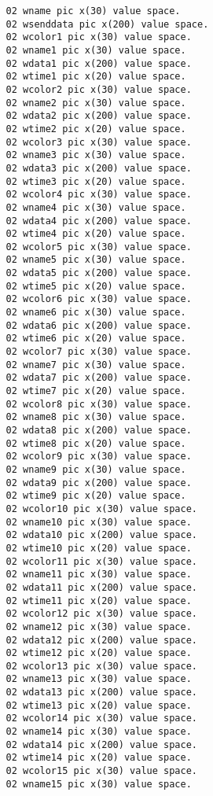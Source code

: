 {{{\begin{verbatim}
          02 wname pic x(30) value space.
          02 wsenddata pic x(200) value space.
          02 wcolor1 pic x(30) value space.
          02 wname1 pic x(30) value space.
          02 wdata1 pic x(200) value space.
          02 wtime1 pic x(20) value space.
          02 wcolor2 pic x(30) value space.
          02 wname2 pic x(30) value space.
          02 wdata2 pic x(200) value space.
          02 wtime2 pic x(20) value space.
          02 wcolor3 pic x(30) value space.
          02 wname3 pic x(30) value space.
          02 wdata3 pic x(200) value space.
          02 wtime3 pic x(20) value space.
          02 wcolor4 pic x(30) value space.
          02 wname4 pic x(30) value space.
          02 wdata4 pic x(200) value space.
          02 wtime4 pic x(20) value space.
          02 wcolor5 pic x(30) value space.
          02 wname5 pic x(30) value space.
          02 wdata5 pic x(200) value space.
          02 wtime5 pic x(20) value space.
          02 wcolor6 pic x(30) value space.
          02 wname6 pic x(30) value space.
          02 wdata6 pic x(200) value space.
          02 wtime6 pic x(20) value space.
          02 wcolor7 pic x(30) value space.
          02 wname7 pic x(30) value space.
          02 wdata7 pic x(200) value space.
          02 wtime7 pic x(20) value space.
          02 wcolor8 pic x(30) value space.
          02 wname8 pic x(30) value space.
          02 wdata8 pic x(200) value space.
          02 wtime8 pic x(20) value space.
          02 wcolor9 pic x(30) value space.
          02 wname9 pic x(30) value space.
          02 wdata9 pic x(200) value space.
          02 wtime9 pic x(20) value space.
          02 wcolor10 pic x(30) value space.
          02 wname10 pic x(30) value space.
          02 wdata10 pic x(200) value space.
          02 wtime10 pic x(20) value space.
          02 wcolor11 pic x(30) value space.
          02 wname11 pic x(30) value space.
          02 wdata11 pic x(200) value space.
          02 wtime11 pic x(20) value space.
          02 wcolor12 pic x(30) value space.
          02 wname12 pic x(30) value space.
          02 wdata12 pic x(200) value space.
          02 wtime12 pic x(20) value space.
          02 wcolor13 pic x(30) value space.
          02 wname13 pic x(30) value space.
          02 wdata13 pic x(200) value space.
          02 wtime13 pic x(20) value space.
          02 wcolor14 pic x(30) value space.
          02 wname14 pic x(30) value space.
          02 wdata14 pic x(200) value space.
          02 wtime14 pic x(20) value space.
          02 wcolor15 pic x(30) value space.
          02 wname15 pic x(30) value space.

\end{verbatim}}}}
